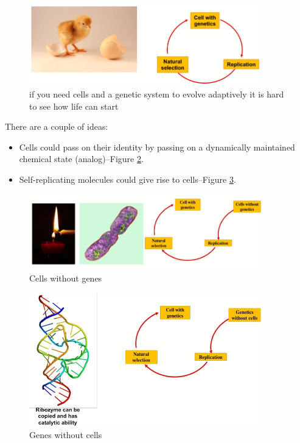 \documentclass[]{article}
\begin{document}
\begin{figure}[H]
	\caption{if you need cells and a genetic system to evolve adaptively it is hard to see how life can start}\label{fig:ChickenEgg}
	\includegraphics[width=0.9\textwidth]{ChickenEgg}
\end{figure}

There are a couple of ideas:

\begin{itemize}
	\item Cells could pass on their identity by passing on a
	dynamically maintained chemical state (analog)--Figure \ref{fig:CellWithoutGenes}.
	\item Self-replicating molecules could give rise to cells--Figure \ref{fig:GenesWithoutCells}.
\end{itemize}

\begin{figure}[H]
	\caption{Cells without genes}\label{fig:CellWithoutGenes}
	\includegraphics[width=0.9\textwidth]{CellWithoutGenes}
\end{figure}

\begin{figure}[H]
	\caption{Genes without cells}\label{fig:GenesWithoutCells}
	\includegraphics[width=0.9\textwidth]{GenesWithoutCells}
\end{figure}
\end{document}
